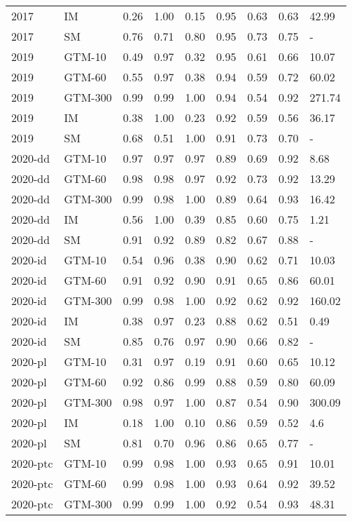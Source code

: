 \begin{tabular}{llrrrrrrl}
2017 & IM & 0.26 & 1.00 & 0.15 & 0.95 & 0.63 & 0.63 & 42.99 \\
2017 & SM & 0.76 & 0.71 & 0.80 & 0.95 & 0.73 & 0.75 & - \\
2019 & GTM-10 & 0.49 & 0.97 & 0.32 & 0.95 & 0.61 & 0.66 & 10.07 \\
2019 & GTM-60 & 0.55 & 0.97 & 0.38 & 0.94 & 0.59 & 0.72 & 60.02 \\
2019 & GTM-300 & 0.99 & 0.99 & 1.00 & 0.94 & 0.54 & 0.92 & 271.74 \\
2019 & IM & 0.38 & 1.00 & 0.23 & 0.92 & 0.59 & 0.56 & 36.17 \\
2019 & SM & 0.68 & 0.51 & 1.00 & 0.91 & 0.73 & 0.70 & - \\
2020-dd & GTM-10 & 0.97 & 0.97 & 0.97 & 0.89 & 0.69 & 0.92 & 8.68 \\
2020-dd & GTM-60 & 0.98 & 0.98 & 0.97 & 0.92 & 0.73 & 0.92 & 13.29 \\
2020-dd & GTM-300 & 0.99 & 0.98 & 1.00 & 0.89 & 0.64 & 0.93 & 16.42 \\
2020-dd & IM & 0.56 & 1.00 & 0.39 & 0.85 & 0.60 & 0.75 & 1.21 \\
2020-dd & SM & 0.91 & 0.92 & 0.89 & 0.82 & 0.67 & 0.88 & - \\
2020-id & GTM-10 & 0.54 & 0.96 & 0.38 & 0.90 & 0.62 & 0.71 & 10.03 \\
2020-id & GTM-60 & 0.91 & 0.92 & 0.90 & 0.91 & 0.65 & 0.86 & 60.01 \\
2020-id & GTM-300 & 0.99 & 0.98 & 1.00 & 0.92 & 0.62 & 0.92 & 160.02 \\
2020-id & IM & 0.38 & 0.97 & 0.23 & 0.88 & 0.62 & 0.51 & 0.49 \\
2020-id & SM & 0.85 & 0.76 & 0.97 & 0.90 & 0.66 & 0.82 & - \\
2020-pl & GTM-10 & 0.31 & 0.97 & 0.19 & 0.91 & 0.60 & 0.65 & 10.12 \\
2020-pl & GTM-60 & 0.92 & 0.86 & 0.99 & 0.88 & 0.59 & 0.80 & 60.09 \\
2020-pl & GTM-300 & 0.98 & 0.97 & 1.00 & 0.87 & 0.54 & 0.90 & 300.09 \\
2020-pl & IM & 0.18 & 1.00 & 0.10 & 0.86 & 0.59 & 0.52 & 4.6 \\
2020-pl & SM & 0.81 & 0.70 & 0.96 & 0.86 & 0.65 & 0.77 & - \\
2020-ptc & GTM-10 & 0.99 & 0.98 & 1.00 & 0.93 & 0.65 & 0.91 & 10.01 \\
2020-ptc & GTM-60 & 0.99 & 0.98 & 1.00 & 0.93 & 0.64 & 0.92 & 39.52 \\
2020-ptc & GTM-300 & 0.99 & 0.99 & 1.00 & 0.92 & 0.54 & 0.93 & 48.31 \\

\end{tabular}

